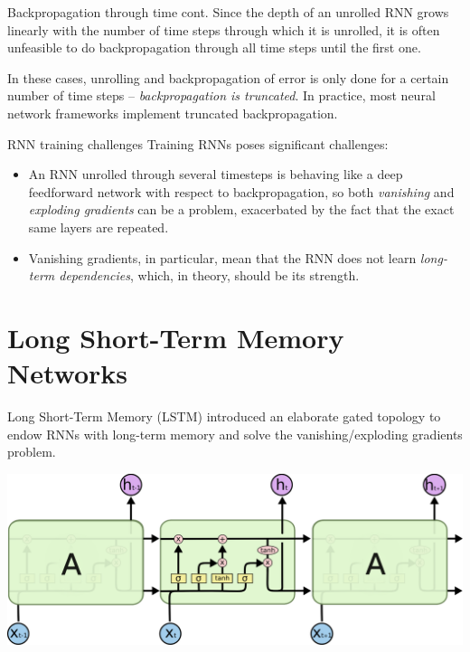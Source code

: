 \documentclass[style=upen, size=14pt]{powerdot}
\newcommand{\gold}{\color{arany}}
\theoremstyle{definition}
\begin{document}
\begin{slide}[toc=]{Backpropagation through time cont.}
  Since the depth of an unrolled RNN grows linearly with the number of time
  steps through which it is unrolled, it is often unfeasible to do
  backpropagation through all time steps until the first one. \bigskip

  In these cases, unrolling and backpropagation of error is only done for a
  certain number of time steps -- \emph{\gold backpropagation is truncated}. In practice,
  most neural network frameworks implement truncated backpropagation.
\end{slide}

\begin{slide}[toc=Challenges]{RNN training challenges}
  Training RNNs poses significant challenges:
  \begin{itemize}
  \item An RNN unrolled through several timesteps is behaving like a deep
    feedforward network with respect to backpropagation, so both \emph{\gold
      vanishing} and \emph{\gold exploding gradients} can be a problem,
    exacerbated by the fact that the exact same layers are repeated.
  \item Vanishing gradients, in particular, mean that the RNN does not learn
    \emph{\gold long-term dependencies}, which, in theory, should be its
    strength.
  \end{itemize}
\end{slide}

\section[toc=LSTMs]{Long Short-Term Memory Networks}

\begin{slide}[toc=LSTM]{Long Short-Term Memory (LSTM)}
  \cite{hochreiter1997long} introduced an elaborate gated topology to endow RNNs
  with long-term memory and solve the vanishing/exploding gradients problem.
  \begin{center}
    \includegraphics[width=1\textwidth]{figures/LSTM3-chain.eps}
  \end{center}
\end{slide}
\end{document}
